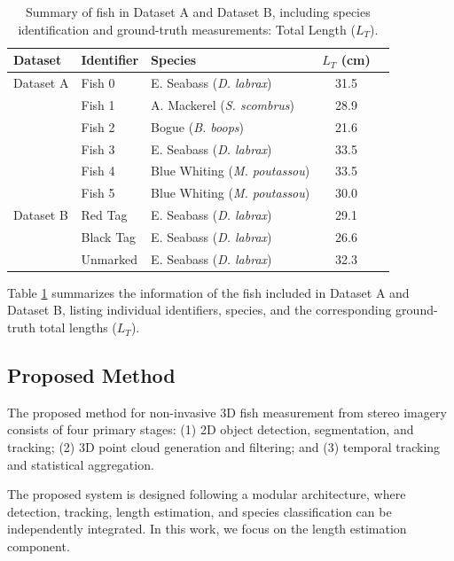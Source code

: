 \documentclass[utf8]{FrontiersinHarvard} %
\begin{document}
\begin{table}[htbp]
\centering
\caption{Summary of fish in Dataset A and Dataset B, including species identification and ground-truth measurements: Total Length ($L_T$). }
\label{tab:fish_datasets}
\begin{tabular}{@{}lllcc@{}}
\toprule
\textbf{Dataset} & \textbf{Identifier} & \textbf{Species} & \textbf{$L_T$ (cm)} \\ \midrule
Dataset A & Fish 0 & E. Seabass (\textit{D. labrax})      & 31.5 \\
          & Fish 1 & A. Mackerel (\textit{S. scombrus})  & 28.9 \\
          & Fish 2 & Bogue (\textit{B. boops})           & 21.6 \\
          & Fish 3 & E. Seabass (\textit{D. labrax})     & 33.5 \\
          & Fish 4 & Blue Whiting (\textit{M. poutassou}) & 33.5 \\
          & Fish 5 & Blue Whiting (\textit{M. poutassou}) & 30.0 \\ \midrule
Dataset B & Red Tag   & E. Seabass (\textit{D. labrax}) & 29.1 \\
          & Black Tag & E. Seabass (\textit{D. labrax}) & 26.6 \\
          & Unmarked  & E. Seabass (\textit{D. labrax}) & 32.3 \\ \bottomrule
\end{tabular}
\end{table}

Table \ref{tab:fish_datasets} summarizes the information of the fish included in Dataset A and Dataset B, listing individual identifiers, species, and the corresponding ground-truth total lengths ($L_T$). 





\subsection{Proposed Method}\label{subsec::method}


The proposed method for non-invasive 3D fish measurement from stereo imagery consists of four primary stages: (1) 2D object detection, segmentation, and tracking; (2) 3D point cloud generation and filtering; and (3) temporal tracking and statistical aggregation.

The proposed system is designed following a modular architecture, where detection, tracking, length estimation, and species classification can be independently integrated. In this work, we focus on the length estimation component.
\end{document}

